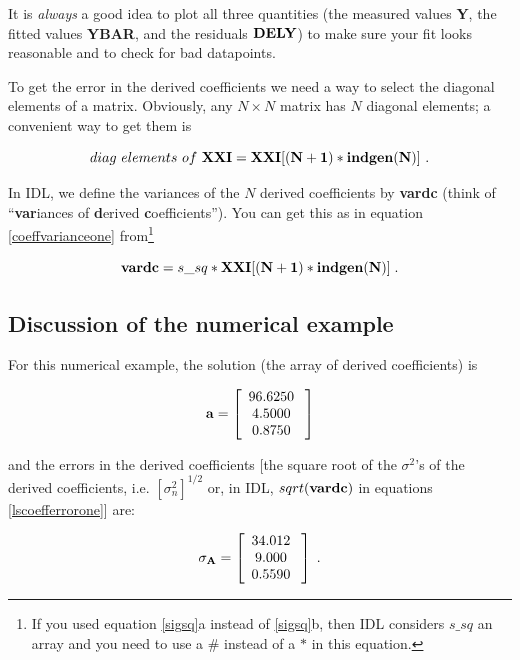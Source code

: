 \documentclass[psfig,preprint]{aastex}
\begin{document}
\noindent It is {\it always} a good idea to plot all three quantities
(the measured values {\bf Y}, the fitted values {\bf YBAR}, and the
residuals ${\bf DELY}$) to make sure your fit looks reasonable and to
check for bad datapoints. 

	To get the error in the derived coefficients we need a way to
select the diagonal elements of a matrix. Obviously, any $N \times N$
matrix has $N$ diagonal elements; a convenient way to get them is

\begin{equation}
diag \ elements \ of \ {\bf XXI}= {\bf XXI[(N+1) * indgen(N)]} \ .
\end{equation}

\noindent In IDL, we define the variances of
the $N$ derived coefficients by {\bf vardc} (think of ``{\bf var}iances of
{\bf d}erived {\bf c}oefficients''). You can get this as in equation
\ref{coeffvarianceone} from\footnote{If you used equation \ref{sigsq}a
instead of \ref{sigsq}b, then IDL considers $s\_ sq$ an array and you
need to use a $\#$ instead of a $*$ in this equation.}

\begin{equation} \label{lscoefferrorone}
{\bf vardc} = s\_sq * {\bf XXI[(N+1)*indgen(N)]} \; .
\end{equation}

\subsection {Discussion of the numerical example}

	For this numerical example, the solution (the array of derived
coefficients) is

\begin{mathletters}
\label{avalues}
\begin{eqnarray}
{\bf a} = \left[
\begin{array}{c}
96.6250 \\
4.5000 \\
0.8750 \\
\end{array} \; \right] 
\end{eqnarray}

\noindent and the errors in the derived coefficients [the square root of
the $\sigma^2$'s of the derived coefficients, i.e.  $[\sigma_n^2]^{1/2}$
or, in IDL, $sqrt({\bf vardc})$ in equations \ref{lscoefferrorone}] are:

\begin{eqnarray}
{\bf \sigma_A} = \left[
\begin{array}{c}
34.012 \\
9.000 \\
0.5590 \\
\end{array} \; \right] \; .
\end{eqnarray}
\end{mathletters}
\end{document}
